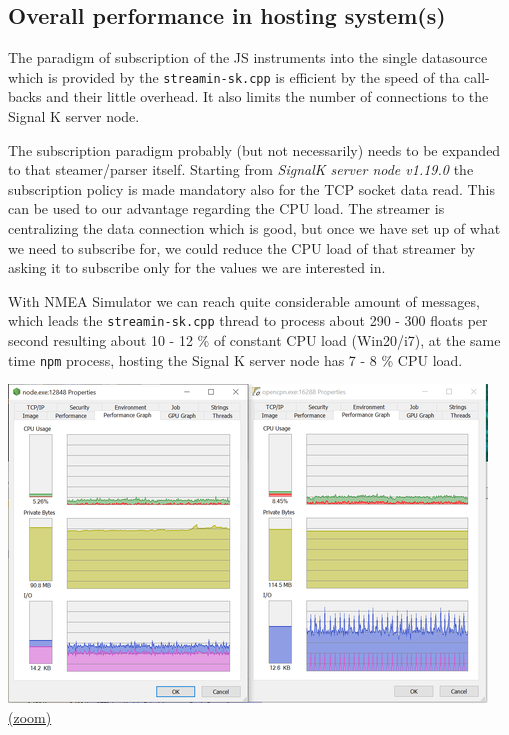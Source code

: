 \documentclass[11pt]{article}
\begin{document}
    \hypertarget{overall-performance-in-hosting-systems}{%
\subsection{Overall performance in hosting
system(s)}\label{overall-performance-in-hosting-systems}}

    The paradigm of subscription of the JS instruments into the single
datasource which is provided by the \texttt{streamin-sk.cpp} is
efficient by the speed of tha call-backs and their little overhead. It
also limits the number of connections to the Signal K server node.

    The subscription paradigm probably (but not necessarily) needs to be
expanded to that steamer/parser itself. Starting from \emph{SignalK
server node v1.19.0} the subscription policy is made mandatory also for
the TCP socket data read. This can be used to our advantage regarding
the CPU load. The streamer is centralizing the data connection which is
good, but once we have set up of what we need to subscribe for, we could
reduce the CPU load of that streamer by asking it to subscribe only for
the values we are interested in.

    With NMEA Simulator we can reach quite considerable amount of messages,
which leads the \texttt{streamin-sk.cpp} thread to process about 290 -
300 floats per second resulting about 10 - 12 \% of constant CPU load
(Win20/i7), at the same time \texttt{npm} process, hosting the Signal K
server node has 7 - 8 \% CPU load.

    \includegraphics{2020-02-09_dgb_procexp_01_instrucjs_clients_alpha_02_sk1-21-0_max_nof_NMEA-2000_msgs.png}
\href{img/2020-02-09_dgb_procexp_01_instrucjs_clients_alpha_02_sk1-21-0_max_nof_NMEA-2000_msgs.png}{(zoom)}
\end{document}
